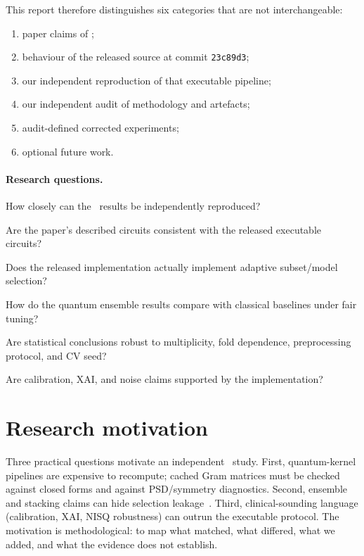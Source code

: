 \documentclass[11pt,a4paper]{article}
\begin{document}
This report therefore distinguishes six categories that are not interchangeable:
\begin{enumerate}[label=\textbf{\Alph*.}]
  \item paper claims of \papername;
  \item behaviour of the released source at commit \texttt{23c89d3};
  \item our independent reproduction of that executable pipeline;
  \item our independent audit of methodology and artefacts;
  \item audit-defined corrected experiments;
  \item optional future work.
\end{enumerate}

\paragraph{Research questions.}
\begin{description}[style=nextline,leftmargin=2.2em]
  \item[RQ1] How closely can the \wdbc\ results be independently reproduced?
  \item[RQ2] Are the paper's described circuits consistent with the released executable circuits?
  \item[RQ3] Does the released implementation actually implement adaptive subset/model selection?
  \item[RQ4] How do the quantum ensemble results compare with classical baselines under fair tuning?
  \item[RQ5] Are statistical conclusions robust to multiplicity, fold dependence, preprocessing protocol, and CV seed?
  \item[RQ6] Are calibration, XAI, and noise claims supported by the implementation?
\end{description}

\section{Research motivation}
\label{sec:motivation}

Three practical questions motivate an independent \wdbc\ study. First, quantum-kernel pipelines are expensive to recompute; cached Gram matrices must be checked against closed forms and against PSD/symmetry diagnostics. Second, ensemble and stacking claims can hide selection leakage~\cite{wolpert1992stacked,varma2006bias,cawley2010overfitting,kapoor2023leakage}. Third, clinical-sounding language (calibration, XAI, NISQ robustness) can outrun the executable protocol. The motivation is methodological: to map what matched, what differed, what we added, and what the evidence does not establish.
\end{document}
